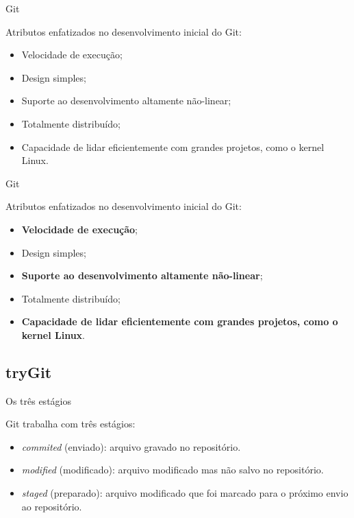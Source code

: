 \documentclass[a4paper]{beamer}
\begin{document}
\begin{frame}{Git}

Atributos enfatizados no desenvolvimento inicial do Git:
\begin{itemize}
\item Velocidade de execução;
\item Design simples;
\item Suporte ao desenvolvimento altamente não-linear;
\item Totalmente distribuído;
\item Capacidade de lidar eficientemente com grandes projetos, como o kernel Linux.
\end{itemize}

\end{frame}

\begin{frame}{Git}

Atributos enfatizados no desenvolvimento inicial do Git:
\begin{itemize}
\item \textbf{Velocidade de execução};
\item Design simples;
\item \textbf{Suporte ao desenvolvimento altamente não-linear};
\item Totalmente distribuído;
\item \textbf{Capacidade de lidar eficientemente com grandes projetos, como o kernel Linux}.
\end{itemize}

\end{frame}

\subsection{tryGit}

\begin{frame}{Os três estágios}

Git trabalha com três estágios:
\begin{itemize}
\item \textit{commited} (enviado): arquivo gravado no repositório.
\item \textit{modified} (modificado): arquivo modificado mas não salvo no repositório.
\item \textit{staged} (preparado): arquivo modificado que foi marcado para o próximo envio ao repositório.
\end{itemize}

\end{frame}
\end{document}
